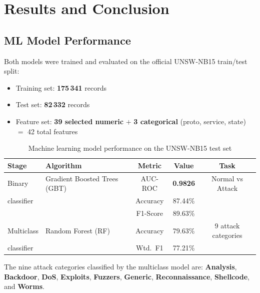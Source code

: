 \documentclass[12pt,a4paper]{report}
\begin{document}
\chapter{Results and Conclusion}

\section{ML Model Performance}
Both models were trained and evaluated on the official UNSW-NB15 train/test
split:
\begin{itemize}
  \item Training set: \textbf{175\,341} records
  \item Test set: \textbf{82\,332} records
  \item Feature set: \textbf{39 selected numeric} $+$ \textbf{3 categorical} (proto,
        service, state) $=$ 42 total features
\end{itemize}

\begin{table}[H]
  \centering
  \caption{Machine learning model performance on the UNSW-NB15 test set}
  \label{tab:model-performance}
  \begin{tabular}{llccc}
    \toprule
    \textbf{Stage}  & \textbf{Algorithm}          & \textbf{Metric}
    & \textbf{Value} & \textbf{Task} \\
    \midrule
    Binary          & Gradient Boosted Trees (GBT) & AUC-ROC  & \textbf{0.9826} & Normal vs Attack \\
    classifier      &                              & Accuracy & 87.44\%         & \\
                    &                              & F1-Score & 89.63\%         & \\
    Multiclass      & Random Forest (RF)           & Accuracy & 79.63\%         & 9 attack categories \\
    classifier      &                              & Wtd.~F1  & 77.21\%         & \\
    \bottomrule
  \end{tabular}
\end{table}

\noindent The nine attack categories classified by the multiclass model are:
\textbf{Analysis}, \textbf{Backdoor}, \textbf{DoS}, \textbf{Exploits},
\textbf{Fuzzers}, \textbf{Generic}, \textbf{Reconnaissance},
\textbf{Shellcode}, and \textbf{Worms}.
\end{document}
